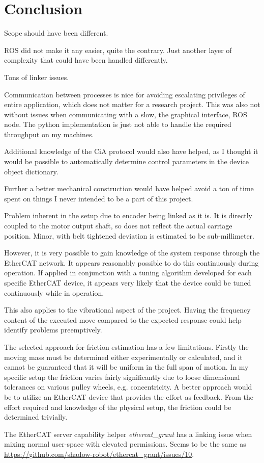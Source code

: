 \section{Conclusion}

Scope should have been different.

ROS did not make it any easier, quite the contrary. 
Just another layer of complexity that could have been handled differently.

Tons of linker issues. 

Communication between processes is nice for avoiding escalating privileges of entire application, which does not matter for a research project. This was also not without issues when communicating with a slow, the graphical interface, ROS node. The python implementation is just not able to handle the required throughput on my machines. 

Additional knowledge of the CiA protocol would also have helped, as I thought it would be possible to automatically determine control parameters in the device object dictionary.

Further a better mechanical construction would have helped avoid a ton of time spent on things I never intended to be a part of this project. 

Problem inherent in the setup due to encoder being linked as it is. 
It is directly coupled to the motor output shaft, so does not reflect the actual carriage position. Minor, with belt tightened deviation is estimated to be sub-millimeter. 

However, it is very possible to gain knowledge of the system response through the EtherCAT network. 
It appears reasonably possible to do this continuously during operation.
If applied in conjunction with a tuning algorithm developed for each specific EtherCAT device, it appears very likely that the device could be tuned continuously while in operation.

This also applies to the vibrational aspect of the project. Having the frequency content of the executed move compared to the expected response could help identify problems preemptively. 

The selected approach for friction estimation has a few limitations. Firstly the moving mass must be determined either experimentally or calculated, and it cannot be guaranteed that it will be uniform in the full span of motion. 
In my specific setup the friction varies fairly significantly due to loose dimensional tolerances on various pulley wheels, e.g. concentricity. 
A better approach would be to utilize an EtherCAT device that provides the effort as feedback. From the effort required and knowledge of the physical setup, the friction could be determined trivially. 

The EtherCAT server capability helper \textit{ethercat\_grant} has a linking issue when mixing normal user-space with elevated permissions. Seems to be the same as \url{https://github.com/shadow-robot/ethercat_grant/issues/10}. 

